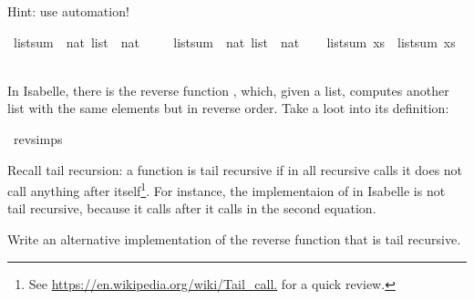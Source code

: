 \begin{isabellebody}
\begin{isamarkuptext}
  Hint: use automation!%
\end{isamarkuptext}\isamarkuptrue%
\isamarkupfalse%
\ list{\isacharunderscore}{\kern0pt}sum\ {\isacharcolon}{\kern0pt}{\isacharcolon}{\kern0pt}\ {\isachardoublequoteopen}nat\ list\ {\isasymRightarrow}\ nat{\isachardoublequoteclose}\ \isanewline
\ \ \isanewline
{}\isamarkupfalse%
\ list{\isacharunderscore}{\kern0pt}sum{\isacharprime}{\kern0pt}\ {\isacharcolon}{\kern0pt}{\isacharcolon}{\kern0pt}\ {\isachardoublequoteopen}nat\ list\ {\isasymRightarrow}\ nat{\isachardoublequoteclose}\isanewline
\ \ %
\isadelimproof
%
\endisadelimproof
%
\isatagproof
%
\endisatagproof
{\isafoldproof}%
%
\isadelimproof
\isanewline
%
\endisadelimproof
{}\isamarkupfalse%
\ {\isachardoublequoteopen}list{\isacharunderscore}{\kern0pt}sum\ xs\ {\isacharequal}{\kern0pt}\ list{\isacharunderscore}{\kern0pt}sum{\isacharprime}{\kern0pt}\ xs{\isachardoublequoteclose}\isanewline
\ \ %
\isadelimproof
%
\endisadelimproof
%
\isatagproof
%
\endisatagproof
{\isafoldproof}%
%
\isadelimproof
%
\endisadelimproof
%
\begin{isamarkuptext}%
In Isabelle, there is the reverse function , which, given a list, computes another list
with the same elements but in reverse order.
Take a loot into its definition:%
\end{isamarkuptext}\isamarkuptrue%
\isamarkupfalse%
\ rev{\isachardot}{\kern0pt}simps%
\begin{isamarkuptext}%
Recall tail recursion: a function is tail recursive if in all recursive calls it does not call 
  anything after itself\footnote{See \url{https://en.wikipedia.org/wiki/Tail_call.} for a quick review.}.
  For instance, the implementaion of  in Isabelle is not tail recursive, because it calls
  \isa{{\isacharparenleft}{\kern0pt}{\isacharat}{\kern0pt}{\isacharparenright}{\kern0pt}} after it calls  in the second equation.
  
  Write an alternative implementation of the reverse function that is tail recursive.


\end{isamarkuptext}
\end{isabellebody}
